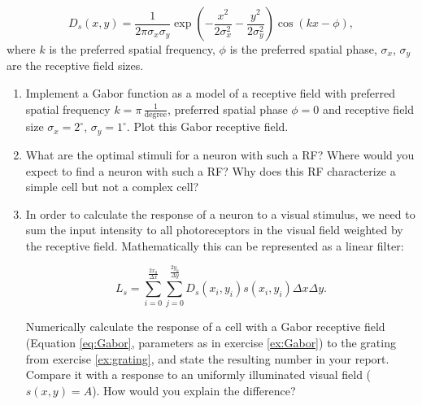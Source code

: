 \documentclass[12pt, a4]{article}
\begin{document}
\begin{enumerate}
        \begin{equation}
           D_s(x,y)=\frac{1}{2\pi\sigma_x\sigma_y}
            \exp\left(-\frac{x^2}{2\sigma_x^2}-\frac
            {y^2}{ 2\sigma_y^2}\right)\cos(kx-\phi),
            \label{eq:Gabor}
        \end{equation}
        where  $k$ is the preferred spatial frequency, $\phi$ is
        the preferred spatial phase,  $\sigma_x$,
        $\sigma_y$ are the receptive field sizes.

        \begin{enumerate}
            \item \label{ex:Gabor}  Implement a Gabor function as a model of
                a receptive field with preferred spatial frequency
                $k=\pi\,\frac{1}{\mathrm{degree}}$,
                preferred spatial phase $\phi=0$
                and receptive field size $\sigma_x=2^\circ$,
                $\sigma_y=1^\circ$. Plot this Gabor receptive field.
                
            \item \label{ex:RF_questions} What are the optimal
                stimuli for a neuron with such a RF? Where would you
                expect to find a neuron with such a RF?  Why does this
                RF characterize a simple cell but not a complex cell?
                
            \item \label{ex:linear_response} In order to calculate the
                response of a neuron to a visual stimulus, we need to
                sum the input intensity to all photoreceptors in the
                visual field weighted by the receptive field.
                Mathematically this can be represented as a linear
                filter:

                \begin{equation}
                    L_s = \sum_{i=0}^{\frac{2x_0}{\Delta x}}
                    \sum_{j=0}^{\frac{2y_0}{\Delta y}} D_s(x_i,y_i) s(x_i,y_i)
                    \Delta x \Delta y.
                    \label{eq:respons}
                \end{equation}
                
                Numerically calculate the response of a cell with a
                Gabor receptive field (Equation \ref{eq:Gabor},
                parameters as in exercise \ref{ex:Gabor}) to the
                grating from exercise \ref{ex:grating}, and state the
                resulting number in your report. Compare it with a
                response to an uniformly illuminated visual field
                ($s(x,y)=A$). How would you explain the difference?


\end{enumerate}
\end{enumerate}
\end{document}
